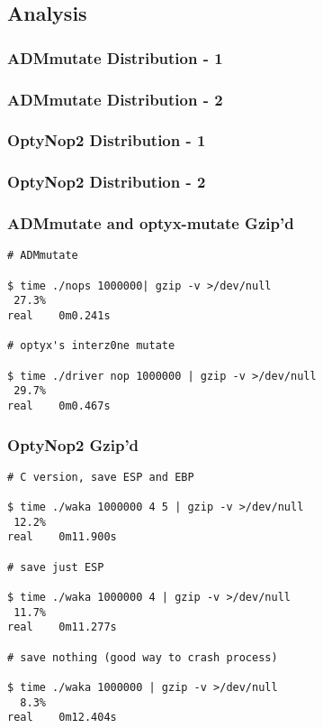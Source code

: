 \documentclass{beamer}
\begin{document}
\subsection{Analysis}

\begin{frame}[fragile]
  \frametitle{ADMmutate Distribution - 1}
  
\end{frame}
\begin{frame}[fragile]
  \frametitle{ADMmutate Distribution - 2}
  
\end{frame}
\begin{frame}[fragile]
  \frametitle{OptyNop2 Distribution - 1}
  
\end{frame}
\begin{frame}[fragile]
  \frametitle{OptyNop2 Distribution - 2}
  
\end{frame}

\begin{frame}[fragile]
  \frametitle{ADMmutate and optyx-mutate Gzip'd}
  {\footnotesize
  \begin{verbatim}
# ADMmutate

$ time ./nops 1000000| gzip -v >/dev/null
 27.3%
real    0m0.241s

# optyx's interz0ne mutate

$ time ./driver nop 1000000 | gzip -v >/dev/null
 29.7%
real    0m0.467s
\end{verbatim}
}
\end{frame}

\begin{frame}[fragile]
  \frametitle{OptyNop2 Gzip'd}
  {\footnotesize
  \begin{verbatim}
# C version, save ESP and EBP

$ time ./waka 1000000 4 5 | gzip -v >/dev/null
 12.2%
real    0m11.900s

# save just ESP

$ time ./waka 1000000 4 | gzip -v >/dev/null
 11.7%
real    0m11.277s

# save nothing (good way to crash process)

$ time ./waka 1000000 | gzip -v >/dev/null
  8.3%
real    0m12.404s
\end{verbatim}
}
\end{frame}
\end{document}
